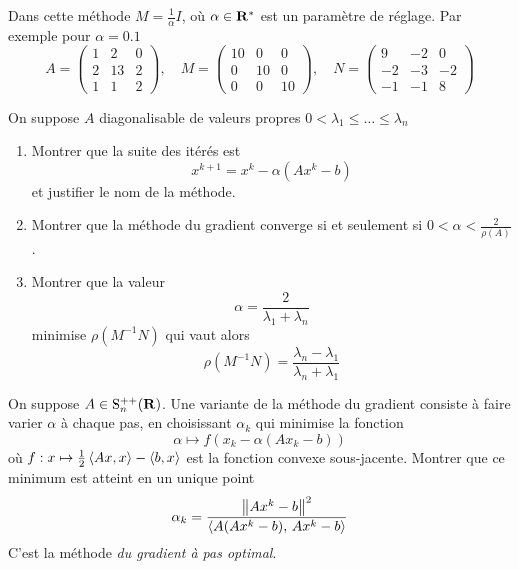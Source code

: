 Dans cette méthode $M = \frac{1}{\alpha} I$, où $\alpha \in \mathbf{R}^*$ est un
paramètre de réglage. Par exemple pour $\alpha = 0.1$
\begin{displaymath}
A = \left(\begin{array}{ccc}
1 & 2 & 0 \\
2 & 13 & 2 \\
 1 & 1 & 2
\end{array}\right)
, \quad M = \left(\begin{array}{ccc}
10 & 0 & 0 \\
0 & 10 & 0 \\
 0 & 0 & 10
\end{array}\right)
, \quad N = \left(\begin{array}{ccc}
9 & -2 & 0 \\
-2 & -3 & -2 \\
-1 & -1 & 8
\end{array}\right)
\end{displaymath}

\begin{exercice}
On suppose $A$ diagonalisable de valeurs propres $0 < \lambda_1 \leq \dots \leq \lambda_n$
\begin{enumerate}
\item Montrer que la suite des itérés est
\begin{displaymath}
x^{k+1} = x^{k} - \alpha (Ax^k -b)
\end{displaymath}
et justifier le nom de la méthode.
\item Montrer que la méthode du gradient converge si et seulement si $\displaystyle 0 < \alpha < \frac{2}{\rho(A)}$.
\item Montrer que la valeur
\begin{displaymath}
\alpha = \frac{2}{\lambda_1 + \lambda_n}
\end{displaymath}
minimise $\rho(M^{-1}N)$ qui vaut alors
\begin{displaymath}
\rho(M^{-1}N) = \frac{\lambda_n - \lambda_1}{\lambda_n + \lambda_1}
\end{displaymath}
\end{enumerate}
\end{exercice}

\begin{exercice}
On suppose $A \in \mathrm{S}^{++}_n(\mathbf{R})$. Une variante de la méthode du gradient
consiste à faire varier $\alpha$ à chaque pas, en choisissant $\alpha_k$
qui minimise la fonction
\begin{displaymath}
\alpha \mapsto f(x_k - \alpha(Ax_k -b))
\end{displaymath}
où $f: x \mapsto \frac{1}{2}\left\langle Ax,x\right\rangle - \left\langle b,x\right\rangle$ est la fonction
convexe sous-jacente. Montrer que ce minimum est atteint en un unique point
\begin{displaymath}
	\alpha_k = \frac{\left\|A x^k - b\right\|^2}{\left\langle A(Ax^k-b),\,Ax^k-b\right\rangle}
\end{displaymath}
C'est la méthode \emph{du gradient à pas optimal}.
\end{exercice}


